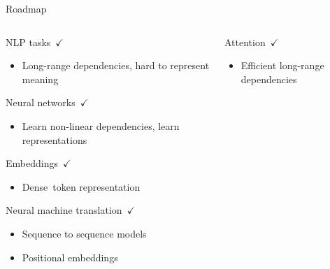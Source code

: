\documentclass[12pt]{beamer}
\begin{document}
\begin{frame}{Roadmap}
	
	\begin{columns}
		
		\begin{column}{0.5\linewidth}
			
			
			NLP tasks $\checkmark$
			
			\begin{itemize}
				\item {\scriptsize Long-range dependencies, hard to represent meaning}
			\end{itemize}
			
			Neural networks $\checkmark$
			
			\begin{itemize}
				\item {\scriptsize Learn non-linear dependencies, learn representations}
			\end{itemize}
			
			Embeddings $\checkmark$
			
			\begin{itemize}
				\item {\scriptsize Dense token representation}
			\end{itemize}
			
			Neural machine translation $\checkmark$
			
			\begin{itemize}
				\item {\scriptsize Sequence to sequence models}
				\item {\scriptsize Positional embeddings}
			\end{itemize}
			
		\end{column}
		
		\begin{column}{0.5\linewidth}
			
			Attention $\checkmark$
			
			\begin{itemize}
				\item {\scriptsize Efficient long-range dependencies}
			\end{itemize}
			
		
			
		\end{column}
		
	\end{columns}
	
\end{frame}
\end{document}
